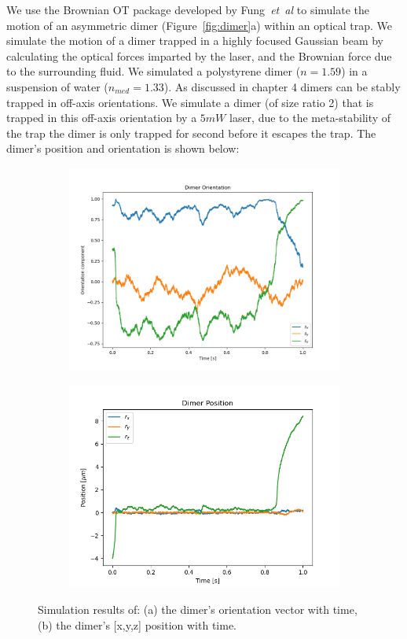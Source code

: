 We use the Brownian OT package developed by Fung~\textit{et~al} 
\cite{Vigilante2020} to simulate the motion of an asymmetric dimer (Figure~\ref{fig:dimer}a) within an optical trap. We simulate the 
motion of a dimer trapped in a highly focused Gaussian beam by 
calculating the optical forces imparted by the laser, and the 
Brownian force due to the surrounding fluid. We simulated a 
polystyrene dimer ($n = 1.59$) in a suspension of water ($n_{med} 
= 1.33$). As discussed in chapter 4 dimers can be stably trapped
in off-axis orientations. We simulate a dimer (of size ratio 2) that
is trapped in this off-axis orientation by a $5 mW$ laser, due to 
the meta-stability of the trap the dimer is only trapped for second
before it escapes the trap. The dimer's position and orientation 
is shown below:
\begin{figure}[h!]
	\centering
	\begin{subfigure}{0.45\textwidth}
		\subcaption{}
		\includegraphics[width =\textwidth]{fig7a.png}
	\end{subfigure}
	\begin{subfigure}{0.45\textwidth}
		\subcaption{}
		\includegraphics[width=\textwidth]{fig7b.png}
	\end{subfigure}
	\caption{Simulation results of: (a) the dimer's orientation vector with time, (b) the dimer's [x,y,z] position with time.}
	\label{fig:motion}
\end{figure}

